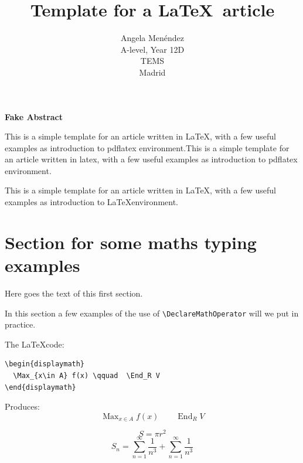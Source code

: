 \documentclass[12pt,a4paper]{article}
\title{Template for a \LaTeX\ article}
\author{Angela Menéndez\\
  \small A-level, Year 12D\\
  \small TEMS\\
  \small Madrid
}
\theoremstyle{definition}
\theoremstyle{remark}
\DeclareMathOperator{\Max}{Max}
\DeclareMathOperator{\End}{End}
\begin{document}
\maketitle





\bigskip 
\begin{center}
\textbf{Fake Abstract}
\end{center}

This is a simple template for an article written in \LaTeX, with a few useful examples as introduction to pdflatex environment.This is a simple template for an article written in latex, with a few useful examples as introduction to pdflatex environment.

This is a simple template for an article written in \LaTeX, with a few useful examples as introduction to \LaTeX environment.


\section{Section for some maths typing examples}\label{sec:maths_examples}

Here goes the text of this first section.

In this section a few examples of the use of 
\verb|\DeclareMathOperator| will we put in practice.


The \LaTeX code:

\begin{center}
\begin{verbatim}
\begin{displaymath}
  \Max_{x\in A} f(x) \qquad  \End_R V 
\end{displaymath}
\end{verbatim}
\end{center}

Produces:
\begin{displaymath}
  \Max_{x\in A} f(x) \qquad  \End_R V 
\end{displaymath}


\begin{equation}\label{eq:area}
  S = \pi r^2
\end{equation}
\[S_n = \sum_{n=1}^{\infty} \frac{1}{n^3} + \sum_{n=1}^{\infty} \frac{1}{n^3}\] 
\end{document}

